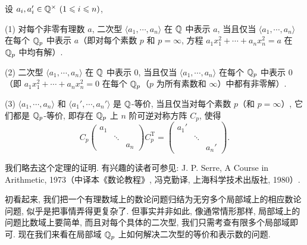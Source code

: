 \begin{theorem}\label{thm:9.9}
设 $a_i,a_i'\in\mathbb{Q}^{\times}\ (1\leqslant i\leqslant n)$,

(1) 对每个非零有理数 $a$, 二次型 $\langle a_1,\cdots,a_n\rangle$ 在 $\mathbb{Q}$ 中表示 $a$, 当且仅当 $\langle a_1,\cdots,a_n\rangle$ 在每个 $\mathbb{Q}_p$ 中表示 $a$（即对每个素数 $p$ 和 $p=\infty$, 方程 $a_1x_1^2+\cdots+a_nx_n^2=a$ 在 $\mathbb{Q}_p$ 中均有解）.

(2) 二次型 $\langle a_1,\cdots,a_n\rangle$ 在 $\mathbb{Q}$ 中表示 $0$, 当且仅当 $\langle a_1,\cdots,a_n\rangle$ 在每个 $\mathbb{Q}_p$ 中表示 $0$（即 $a_1x_1^2+\cdots+a_nx_n^2=0$ 在每个 $\mathbb{Q}_p$（$p$ 为所有素数和 $\infty$）中都有非零解）.

(3) $\langle a_1,\cdots,a_n\rangle$ 和 $\langle a_1',\cdots,a_n'\rangle$ 是 $\mathbb{Q}$-等价, 当且仅当对每个素数 $p$（和 $p=\infty$）, 它们都是 $\mathbb{Q}_p$-等价, 即存在 $\mathbb{Q}_p$ 上 $n$ 阶可逆对称方阵 $C_p$, 使得
\[
  C_p\left(\begin{array}{ccc}a_1& &\\ & \ddots &\\ & & a_n\end{array}\right)
  C_p^{\mathrm{T}}
  =\left(\begin{array}{ccc}a_1'& &\\ & \ddots &\\ & & a_n'\end{array}\right).
\]
\end{theorem}

我们略去这个定理的证明. 有兴趣的读者可参见: J. P. Serre, A Course in Arithmetic, 1973（中译本《数论教程》, 冯克勤译, 上海科学技术出版社, 1980）.

初看起来, 我们把一个有理数域上的数论问题归结为无穷多个局部域上的相应数论问题, 似乎是把事情弄得更复杂了. 但事实并非如此, 像通常情形那样, 局部域上的问题比数域上要简单, 而且对每个具体的二次型, 我们只需考查有限多个局部域即可. 现在我们来看在局部域 $\mathbb{Q}_p$ 上如何解决二次型的等价和表示数的问题.

